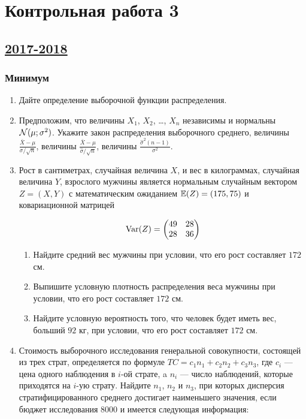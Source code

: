 \section{Контрольная работа 3}



\subsection[2017-2018]{\hyperref[sec:sol_kr_03_2017_2018]{2017-2018}}
\label{sec:kr_03_2017_2018}



	\subsubsection{Минимум}

	\begin{enumerate}
	\item Дайте определение выборочной функции распределения.
	\item Предположим, что величины $X_1$, $X_2$, \ldots, $X_n$ независимы и нормальны $\mathcal{N}(\mu;\sigma^2)$. Укажите закон распределения выборочного среднего, величины $\frac{\bar X - \mu}{\sigma/\sqrt{n}}$, величины $\frac{\bar X - \mu}{\hat\sigma/\sqrt{n}}$, величины $\frac{\hat\sigma^2(n-1)}{\sigma^2}$.
	\item Рост в сантиметрах, случайная величина $X$, и вес в килограммах, случайная величина $Y$, взрослого мужчины является нормальным случайным вектором $Z = (X, Y)$ с математическим ожиданием $\operatorname{\mathbb{E}}(Z) = (175, 75)$ и ковариационной матрицей

	\[
	\operatorname{Var}(Z) =
	\begin{pmatrix}
	49 & 28 \\
	28 & 36
	\end{pmatrix}
	\]

	\begin{enumerate}
		\item Найдите средний вес мужчины при условии, что его рост составляет $172$ см.
		\item Выпишите условную плотность распределения веса мужчины при условии, что его рост составляет $172$ см.
		\item Найдите условную вероятность того, что человек будет иметь вес, больший $92$ кг, при условии, что его рост составляет $172$ см.
	\end{enumerate}

	\item Стоимость выборочного исследования генеральной совокупности, состоящей из трех страт, определяется по формуле $TC = c_1n_1 + c_2n_2 + c_3n_3$, где $c_i$ — цена одного наблюдения в $i$-ой страте, a $n_i$ — число наблюдений, которые приходятся на $i$-ую страту. Найдите $n_1$, $n_2$ и $n_3$, при которых дисперсия стратифицированного среднего достигает наименьшего значения, если бюджет исследования 8000 и имеется следующая информация:


\end{enumerate}
